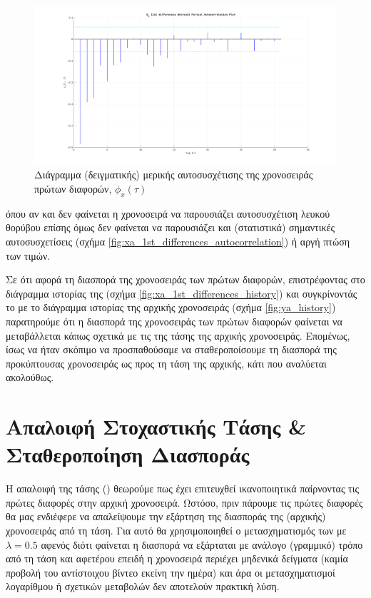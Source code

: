 \begin{figure}[H]
    \begin{center}
        \includegraphics[width=\textwidth]{plots/xa_1st_differences_partial_autocorrelation.svg.pdf}
        \caption{Διάγραμμα (δειγματικής) μερικής αυτοσυσχέτισης της χρονοσειράς πρώτων διαφορών, $\phi_x(\tau)$}
        \label{fig:xa_1st_differences_partial_autocorrelation}
    \end{center}
\end{figure}

όπου αν και δεν φαίνεται η χρονοσειρά να παρουσιάζει αυτοσυσχέτιση λευκού θορύβου επίσης όμως δεν φαίνεται να παρουσιάζει και (στατιστικά) σημαντικές αυτοσυσχετίσεις (σχήμα \ref{fig:xa_1st_differences_autocorrelation}) ή αργή πτώση των τιμών. 

Σε ότι αφορά τη διασπορά της χρονοσειράς των πρώτων διαφορών, επιστρέφοντας στο διάγραμμα ιστορίας της (σχήμα \ref{fig:xa_1st_differences_history}) και συγκρίνοντάς το με το διάγραμμα ιστορίας της αρχικής χρονοσειράς (σχήμα \ref{fig:ya_history}) παρατηρούμε ότι η διασπορά της χρονοσειράς των πρώτων διαφορών φαίνεται να μεταβάλλεται κάπως σχετικά με τις  της τάσης της αρχικής χρονοσειράς. Επομένως, ίσως να ήταν σκόπιμο να προσπαθούσαμε να σταθεροποίσουμε τη διασπορά της προκύπτουσας χρονοσειράς ως προς τη τάση της αρχικής, κάτι που αναλύεται ακολούθως.

\section{Απαλοιφή Στοχαστικής Τάσης \& Σταθεροποίηση Διασποράς}

Η απαλοιφή της τάσης () θεωρούμε πως έχει επιτευχθεί ικανοποιητικά παίρνοντας τις πρώτες διαφορές στην αρχική χρονοσειρά. Ωστόσο, πριν πάρουμε τις πρώτες διαφορές θα μας ενδιέφερε να απαλείψουμε την εξάρτηση της διασποράς της (αρχικής) χρονοσειράς από τη τάση. Για αυτό θα χρησιμοποιηθεί ο μετασχηματισμός των  με $\lambda=0.5$ αφενός διότι φαίνεται η διασπορά να εξάρταται με ανάλογο (γραμμικό) τρόπο από τη τάση και αφετέρου επειδή η χρονοσειρά περιέχει μηδενικά δείγματα (καμία προβολή του αντίστοιχου βίντεο εκείνη την ημέρα) και άρα οι μετασχηματισμοί λογαρίθμου ή σχετικών μεταβολών δεν αποτελούν πρακτική λύση.

